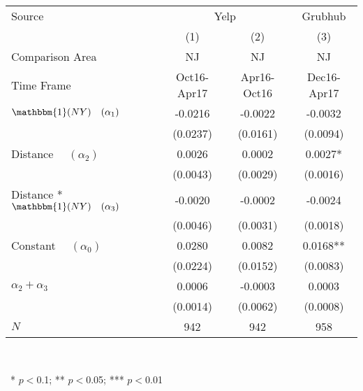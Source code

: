 \begin{center}
\begin{tabular}{lccc}
\hline Source & \multicolumn{2}{c}{Yelp} & Grubhub\\
 & (1) & (2) & (3)\\
Comparison Area &   NJ    &   NJ    &   NJ   \\
Time Frame & Oct16-Apr17 & Apr16-Oct16 & Dec16-Apr17\\
\hline  $ \mathbbm{1}(NY) \quad (\alpha_1) $  & -0.0216 & -0.0022 & -0.0032\\
  & (0.0237) & (0.0161) & (0.0094)\\
 Distance $\quad (\alpha_2) $  & 0.0026 & 0.0002 & 0.0027*\\
  & (0.0043) & (0.0029) & (0.0016)\\
 Distance * $ \mathbbm{1}(NY) \quad (\alpha_3) $  & -0.0020 & -0.0002 & -0.0024\\
  & (0.0046) & (0.0031) & (0.0018)\\
 Constant $\quad (\alpha_0) $  & 0.0280 & 0.0082 & 0.0168**\\
  & (0.0224) & (0.0152) & (0.0083)\\
\hline  $ \alpha_2 + \alpha_3 $  & 0.0006 & -0.0003 & 0.0003\\
  & (0.0014) & (0.0062) & (0.0008)\\
\hline  $ N $  & 942 & 942 & 958\\
\hline\end{tabular}\\
\begin{tiny}\ * $p<0$.1; ** $p<0$.05; *** $p<0$.01\end{tiny}\\
\end{center}
